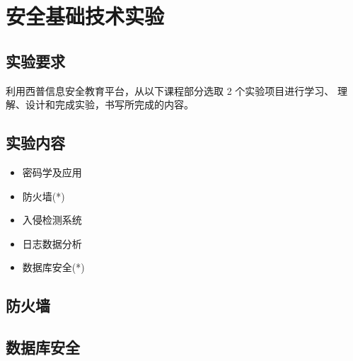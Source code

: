 \documentclass[../main.tex]{subfiles}
\begin{document}
\chapter{安全基础技术实验}
\section{实验要求}
利用西普信息安全教育平台，从以下课程部分选取 2 个实验项目进行学习、
理解、设计和完成实验，书写所完成的内容。
%
\section{实验内容}
\begin{itemize}
  \item 密码学及应用
  \item 防火墙(*)
  \item 入侵检测系统
  \item 日志数据分析
  \item 数据库安全(*)
\end{itemize}
%
\section{防火墙}
%
%
%
%
%

%
%
%
%
\section{数据库安全}
%
%
%
%

\end{document}
